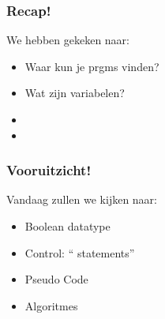 
\begin{frame}
\frametitle{Recap!}


We hebben gekeken naar:
\begin{itemize}
	\item<2-> Waar kun je prgms vinden?
	\item<3-> Wat zijn variabelen?
	\item<4-> 
	\item<5-> 
\end{itemize}
\end{frame}

\begin{frame}
\frametitle{Vooruitzicht!}

Vandaag zullen we kijken naar:
\begin{itemize}
	\item<2-> Boolean datatype
	\item<3-> Control: `` statements''
	\item<4-> Pseudo Code
	\item<5-> Algoritmes
\end{itemize}

\end{frame}


